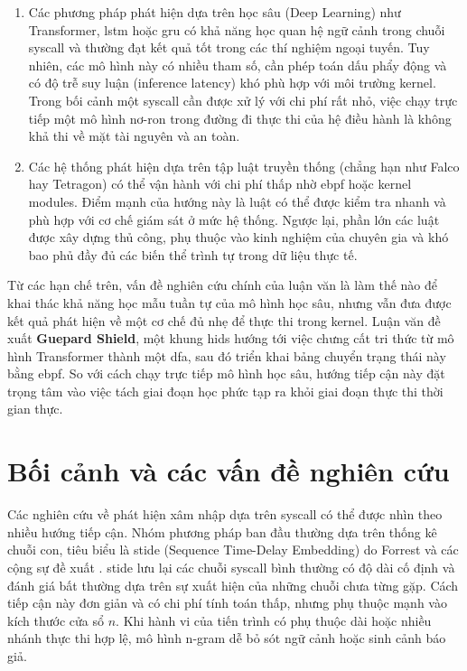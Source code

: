 \documentclass[../main.tex]{subfiles}
\begin{document}
\begin{enumerate}
  \item Các phương pháp phát hiện dựa trên học sâu (Deep Learning)
    như Transformer, \gls{lstm} \cite{hochreiter1997lstm} hoặc \gls{gru}
    \cite{cho2014gru} có khả năng học quan hệ ngữ cảnh
    trong chuỗi \gls{syscall} và thường đạt kết quả tốt trong các thí
    nghiệm ngoại tuyến. Tuy nhiên, các mô hình này có nhiều tham số,
    cần phép toán dấu phẩy động và có độ trễ suy luận (inference
    latency) khó phù hợp với môi trường kernel. Trong bối cảnh một
    \gls{syscall} cần được xử lý với chi phí rất nhỏ, việc chạy trực tiếp
    một mô hình nơ-ron trong đường đi thực thi của hệ điều hành là
    không khả thi về mặt tài nguyên và an toàn.
  \item Các hệ thống phát hiện dựa trên tập luật truyền thống (chẳng
    hạn như Falco hay Tetragon) có thể vận hành với chi phí thấp nhờ
    \gls{ebpf} hoặc kernel modules. Điểm mạnh của hướng này là luật có thể
    được kiểm tra nhanh và phù hợp với cơ chế giám sát ở mức hệ
    thống. Ngược lại, phần lớn các luật được xây dựng thủ công, phụ
    thuộc vào kinh nghiệm của chuyên gia và khó bao phủ đầy đủ các
    biến thể trình tự trong dữ liệu thực tế.
\end{enumerate}

Từ các hạn chế trên, vấn đề nghiên cứu chính của luận văn là làm thế
nào để khai thác khả năng học mẫu tuần tự của mô hình học sâu, nhưng
vẫn đưa được kết quả phát hiện về một cơ chế đủ nhẹ để thực thi trong
kernel. Luận văn đề xuất \textbf{Guepard Shield}, một khung \gls{hids}
hướng tới việc chưng cất tri thức từ mô hình Transformer thành một
\gls{dfa}, sau đó triển khai bảng chuyển trạng thái này bằng \gls{ebpf}\@. So với
cách chạy trực tiếp mô hình học sâu, hướng tiếp cận này đặt trọng tâm
vào việc tách giai đoạn học phức tạp ra khỏi giai đoạn thực thi thời
gian thực.

\section{Bối cảnh và các vấn đề nghiên cứu}
\label{sec:giaiphap}

Các nghiên cứu về phát hiện xâm nhập dựa trên \gls{syscall} có thể được
nhìn theo nhiều hướng tiếp cận. Nhóm phương pháp ban đầu thường dựa
trên thống kê chuỗi con, tiêu biểu là \gls{stide} (Sequence Time-Delay
Embedding) do Forrest và các cộng sự đề xuất
\cite{forrest1996sense}. \Gls{stide} lưu lại các chuỗi \gls{syscall} bình thường
có độ dài cố định và đánh giá bất thường dựa trên sự xuất hiện của
những chuỗi chưa từng gặp. Cách tiếp cận này đơn giản và có chi phí
tính toán thấp, nhưng phụ thuộc mạnh vào kích thước cửa sổ $n$. Khi
hành vi của tiến trình có phụ thuộc dài hoặc nhiều nhánh thực thi hợp
lệ, mô hình n-gram dễ bỏ sót ngữ cảnh hoặc sinh cảnh báo giả.
\end{document}
